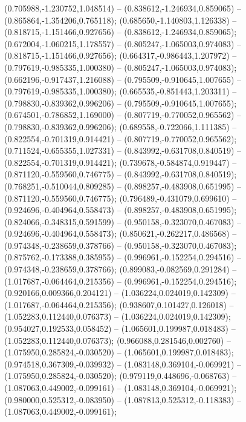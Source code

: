  (0.705988,-1.230752,1.048514) -- (0.838612,-1.246934,0.859065) -- (0.865864,-1.354206,0.765118);
 (0.685650,-1.140803,1.126338) -- (0.818715,-1.151466,0.927656) -- (0.838612,-1.246934,0.859065);
 (0.672004,-1.060215,1.178557) -- (0.805247,-1.065003,0.974083) -- (0.818715,-1.151466,0.927656);
 (0.664317,-0.986443,1.207972) -- (0.797619,-0.985335,1.000380) -- (0.805247,-1.065003,0.974083);
 (0.662196,-0.917437,1.216088) -- (0.795509,-0.910645,1.007655) -- (0.797619,-0.985335,1.000380);
 (0.665535,-0.851443,1.203311) -- (0.798830,-0.839362,0.996206) -- (0.795509,-0.910645,1.007655);
 (0.674501,-0.786852,1.169000) -- (0.807719,-0.770052,0.965562) -- (0.798830,-0.839362,0.996206);
 (0.689558,-0.722066,1.111385) -- (0.822554,-0.701319,0.914421) -- (0.807719,-0.770052,0.965562);
 (0.711524,-0.655355,1.027331) -- (0.843992,-0.631708,0.840519) -- (0.822554,-0.701319,0.914421);
 (0.739678,-0.584874,0.919447) -- (0.871120,-0.559560,0.746775) -- (0.843992,-0.631708,0.840519);
 (0.768251,-0.510044,0.809285) -- (0.898257,-0.483908,0.651995) -- (0.871120,-0.559560,0.746775);
 (0.796489,-0.431079,0.699610) -- (0.924696,-0.404964,0.558473) -- (0.898257,-0.483908,0.651995);
 (0.824066,-0.348315,0.591599) -- (0.950158,-0.323070,0.467083) -- (0.924696,-0.404964,0.558473);
 (0.850621,-0.262217,0.486568) -- (0.974348,-0.238659,0.378766) -- (0.950158,-0.323070,0.467083);
 (0.875762,-0.173388,0.385955) -- (0.996961,-0.152254,0.294516) -- (0.974348,-0.238659,0.378766);
 (0.899083,-0.082569,0.291284) -- (1.017687,-0.064464,0.215356) -- (0.996961,-0.152254,0.294516);
 (0.920166,0.009366,0.204121) -- (1.036224,0.024019,0.142309) -- (1.017687,-0.064464,0.215356);
 (0.938607,0.101427,0.126018) -- (1.052283,0.112440,0.076373) -- (1.036224,0.024019,0.142309);
 (0.954027,0.192533,0.058452) -- (1.065601,0.199987,0.018483) -- (1.052283,0.112440,0.076373);
 (0.966088,0.281546,0.002760) -- (1.075950,0.285824,-0.030520) -- (1.065601,0.199987,0.018483);
 (0.974518,0.367309,-0.039932) -- (1.083148,0.369104,-0.069921) -- (1.075950,0.285824,-0.030520);
 (0.979119,0.448696,-0.068763) -- (1.087063,0.449002,-0.099161) -- (1.083148,0.369104,-0.069921);
 (0.980000,0.525312,-0.083950) -- (1.087813,0.525312,-0.118383) -- (1.087063,0.449002,-0.099161);
